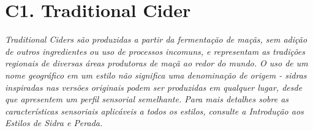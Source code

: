 \section*{C1. Traditional Cider}
\textit{Traditional Ciders são produzidas a partir da fermentação de maçãs, sem adição de outros ingredientes ou uso de processos incomuns, e representam as tradições regionais de diversas áreas produtoras de maçã ao redor do mundo. O uso de um nome geográfico em um estilo não significa uma denominação de origem - sidras inspiradas nas versões originais podem ser produzidas em qualquer lugar, desde que apresentem um perfil sensorial semelhante. Para mais detalhes sobre as características sensoriais aplicáveis a todos os estilos, consulte a Introdução aos Estilos de Sidra e Perada.}
